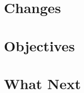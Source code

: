 \documentclass[../dissertation.tex]{subfiles}
\begin{document}
\section{Changes}


\section{Objectives}


\section{What Next}
\end{document}
